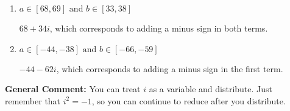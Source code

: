 \documentclass{extbook}[14pt]
\begin{document}
\begin{enumerate}
{\begin{enumerate}[label=\Alph*.]
* $68 - 34 i$, which is the correct option.
\item \( a \in [68, 69] \text{ and } b \in [33, 38] \)

 $68 + 34 i$, which corresponds to adding a minus sign in both terms.
\item \( a \in [-44, -38] \text{ and } b \in [-66, -59] \)

 $-44 - 62 i$, which corresponds to adding a minus sign in the first term.
\end{enumerate}

\textbf{General Comment:} You can treat $i$ as a variable and distribute. Just remember that $i^2=-1$, so you can continue to reduce after you distribute.
}
\end{enumerate}
\end{document}
